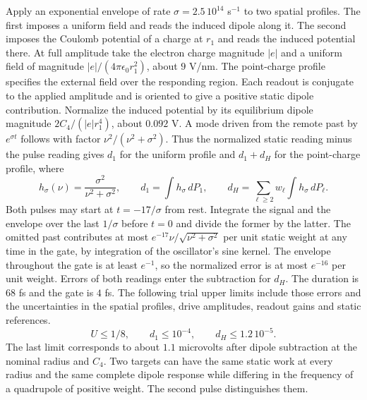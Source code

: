 \documentclass[11pt,a4paper]{article}
\begin{document}
Apply an exponential envelope of rate \(\sigma=2.5\,10^{14}\) s\(^{-1}\)
to two spatial profiles. The first imposes a uniform field and reads the
induced dipole along it. The second imposes the Coulomb potential of a
charge at \(r_1\) and reads the induced potential there. At full
amplitude take the electron charge magnitude \(|e|\) and a uniform field
of magnitude \(|e|/(4\pi\epsilon_0 r_1^2)\), about \(9\) V/nm. The
point-charge profile specifies the external field over the responding
region. Each readout is conjugate to the applied amplitude and is
oriented to give a positive static dipole contribution. Normalize the
induced potential by its equilibrium dipole magnitude
\(2C_4/(|e|r_1^4)\), about \(0.092\) V. A mode driven from the remote
past by \(e^{\sigma t}\) follows with factor \(\nu^2/(\nu^2+\sigma^2)\).
Thus the normalized static reading minus the pulse reading gives \(d_1\)
for the uniform profile and \(d_1+d_H\) for the point-charge profile,
where \[
 h_\sigma(\nu)=\frac{\sigma^2}{\nu^2+\sigma^2},\qquad
 d_1=\int h_\sigma\,dP_1,\qquad
 d_H=\sum_{\ell\ge2}w_\ell\int h_\sigma\,dP_\ell .
\] Both pulses may start at \(t=-17/\sigma\) from rest. Integrate the
signal and the envelope over the last \(1/\sigma\) before \(t=0\) and
divide the former by the latter. The omitted past contributes at most
\(e^{-17}\nu/\sqrt{\nu^2+\sigma^2}\) per unit static weight at any time
in the gate, by integration of the oscillator's sine kernel. The
envelope throughout the gate is at least \(e^{-1}\), so the normalized
error is at most \(e^{-16}\) per unit weight. Errors of both readings
enter the subtraction for \(d_H\). The duration is \(68\) fs and the
gate is \(4\) fs. The following trial upper limits include those errors
and the uncertainties in the spatial profiles, drive amplitudes, readout
gains and static references. \[
 U\le1/8,\qquad d_1\le10^{-4},\qquad d_H\le1.2\,10^{-5}.
\] The last limit corresponds to about \(1.1\) microvolts after dipole
subtraction at the nominal radius and \(C_4\). Two targets can have the
same static work at every radius and the same complete dipole response
while differing in the frequency of a quadrupole of positive weight. The
second pulse distinguishes them.
\end{document}
